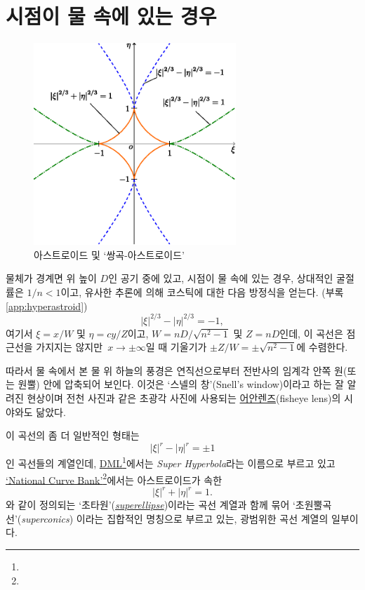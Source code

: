 \documentclass[twocolumn]{article}
\begin{document}
\section{시점이 물 속에 있는 경우}

\begin{figure}
	\centering
	\includegraphics[width=3in]{figs/g254.eps}
	\caption{아스트로이드 및 `쌍곡-아스트로이드'}
	\label{fig:hyperastroid}
\end{figure}

물체가 경계면 위 높이 $D$인 공기 중에 있고, 
시점이 물 속에 있는 경우, 상대적인 굴절률은 $1/n < 1$이고, 
유사한 추론에 의해 코스틱에 대한 다음 방정식을 얻는다. (부록 \ref{app:hyperastroid})
$$ \left| \xi \right|^{2/3} - \left| \eta \right|^{2/3} = -1, $$
여기서 $\xi = {x}/{W} $ 및 $\eta = c{y}/{Z}$이고, 
$W = {nD}/{\sqrt{n^2-1}}$ 및 $Z = nD$인데,  
이 곡선은 점근선을 가지지는 않지만 $x\rightarrow\pm\infty$일 때 
기울기가 $\pm Z/W = \pm \sqrt{n^2-1}$에 수렴한다.

따라서 물 속에서 본 물 위 하늘의 풍경은
연직선으로부터 전반사의 임계각 안쪽 원(또는 원뿔) 안에 압축되어 보인다. 이것은 
`스넬의 창'(Snell's window)이라고 하는 잘 알려진 현상이며 전천 사진과 같은 초광각 
사진에 사용되는 \href{https://ko.wikipedia.org/wiki/%EC%96%B4%EC%95%88_%EB%A0%8C%EC%A6%88}{어안렌즈}(fisheye lens)의 시야와도 닮았다.

이 곡선의 좀 더 일반적인 형태는 
$$ \left| \xi \right|^{r} - \left| \eta \right|^{r} = \pm1 $$
인 곡선들의 계열인데, \href{http://dynamicmathematicslearning.com/super-ellipse.html}%
{DML}\footnote{}에서는 \emph{Super Hyperbola}라는 이름으로 부르고 있고 
\href{https://old.nationalcurvebank.org/superconicncb/superconicncb.htm}{`National Curve Bank'}\footnote{}에서는
아스트로이드가 속한 
$$ \left| \xi \right|^{r} + \left| \eta \right|^{r} = 1. $$
와 같이 정의되는 `초타원'(\href{https://mathworld.wolfram.com/Astroid.html}%
{\emph{superellipse}})이라는 곡선 계열과 함께 묶어
`초원뿔곡선'(\emph{superconics}) 이라는 집합적인 명칭으로 부르고 있는, 광범위한 곡선 계열의 일부이다.
\end{document}
